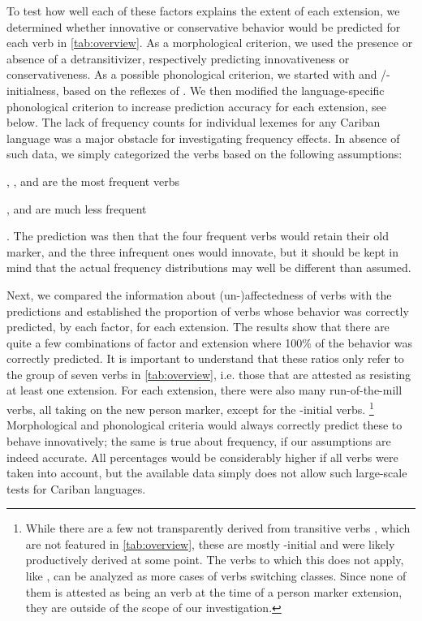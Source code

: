 To test how well each of these factors explains the extent of each extension, we determined whether innovative or conservative behavior would be predicted for each verb in \cref{tab:overview}.
As a morphological criterion, we used the presence or absence of a detransitivizer, respectively predicting innovativeness or conservativeness.
As a possible phonological criterion, we started with  and /-initialness, based on the reflexes of \detrz.
We then modified the language-specific phonological criterion to increase prediction accuracy for each extension, see below.
The lack of frequency counts for individual lexemes for any Cariban language was a major obstacle for investigating frequency effects.
In absence of such data, we simply categorized the verbs based on the following assumptions:
\begin{inlinelist}
	\item {}, , and  are the most frequent  verbs
	\item {},  and  are much less frequent
\end{inlinelist}.
The prediction was then that the four frequent verbs would retain their old marker, and the three infrequent ones would innovate, but it should be kept in mind that the actual frequency distributions may well be different than assumed.

Next, we compared the information about (un-)affectedness of verbs  with the predictions and established the proportion of verbs whose behavior was correctly predicted, by each factor, for each extension.
The results  show that there are quite a few combinations of factor and extension where 100\% of the behavior was correctly predicted.
It is important to understand that these ratios only refer to the group of seven verbs in \cref{tab:overview}, i.e. those that are attested as resisting at least one extension.
For each extension, there were also many run-of-the-mill  verbs, all taking on the new person marker, except for the \akuriyo {}-initial verbs.%
\footnote{While there are a few  not transparently derived from transitive verbs \parencites[252]{triomeira1999}[222]{meira2000split}[30]{gildea2007greenberg}, which are not featured in \cref{tab:overview}, these are mostly -initial and were likely productively derived at some point.
The verbs to which this does not apply, like \trio {}  \parencites[252]{triomeira1999}, can be analyzed as more cases of  verbs switching classes.
Since none of them is attested as being an  verb at the time of a person marker extension, they are outside of the scope of our investigation.}
Morphological and phonological criteria would always correctly predict these to behave innovatively; the same is true about frequency, if our assumptions are indeed accurate.
All percentages would be considerably higher if all verbs were taken into account, but the available data simply does not allow such large-scale tests for Cariban languages.


